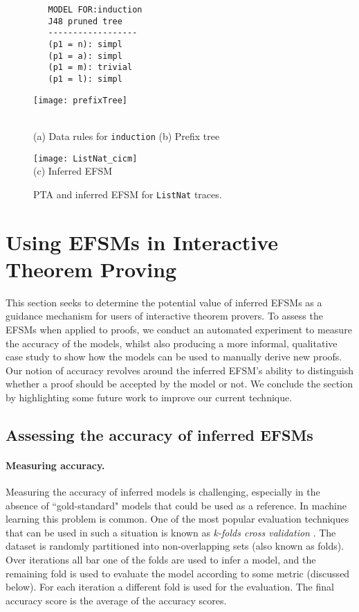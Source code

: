 \documentclass{llncs}
\begin{document}
\begin{figure}
\centering
\begin{minipage}[b]{0.2\textwidth}
\begin{verbatim}
   MODEL FOR:induction
   J48 pruned tree
   ------------------
   (p1 = n): simpl 
   (p1 = a): simpl 
   (p1 = m): trivial 
   (p1 = l): simpl 
\end{verbatim}
\vspace{2cm}
\end{minipage}
\hspace{2cm}\begin{minipage}[b]{0.5\textwidth}\texttt{[image: prefixTree]}\end{minipage}\\
(a) Data rules for {\tt induction} \hspace{4cm} (b) Prefix tree

\hspace*{-1cm}\texttt{[image: ListNat\_cicm]}\\
(c) Inferred EFSM
\caption{PTA and inferred EFSM for {\tt ListNat} traces. }
\label{fig:model}
\end{figure}

\section{Using EFSMs in Interactive Theorem Proving}
\label{sec:using}
This section seeks to determine the potential value of inferred EFSMs as a guidance mechanism for users of interactive theorem provers. To assess the EFSMs when applied to proofs, we conduct an automated experiment to measure the accuracy of the models, whilst also producing a more informal, qualitative case study to show how the models can be used to manually derive new proofs. Our notion of accuracy revolves around the inferred EFSM's ability to distinguish whether a proof should be accepted by the model or not. We conclude the section by highlighting some future work to improve our current technique.

\subsection{Assessing the accuracy of inferred EFSMs}
\paragraph{Measuring accuracy.}
Measuring the accuracy of inferred models is challenging, especially in the absence of ``gold-standard" models that could be used as a reference. In machine learning this problem is common. One of the most popular evaluation techniques that can be used in such a situation is known as \emph{k-folds cross validation} \cite{Kohavi95}. The dataset is randomly partitioned into  non-overlapping sets (also known as folds). Over  iterations all bar one of the folds are used to infer a model, and the remaining fold is used to evaluate the model according to some metric (discussed below). For each iteration a different fold is used for the evaluation. The final accuracy score is the average of the  accuracy scores.
\end{document}
